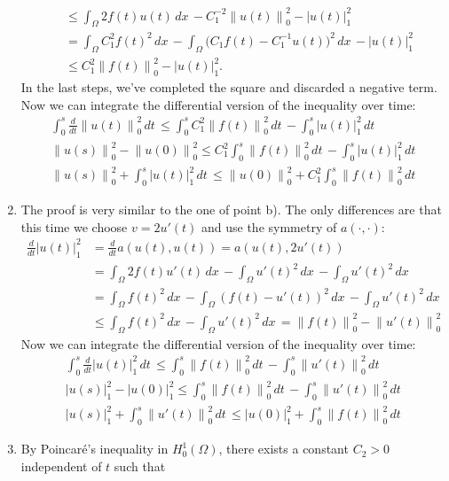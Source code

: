 \documentclass[a4paper]{article}
\newcommand{\dx}{\, dx \,}
\newcommand{\dt}{\, dt \,}
\newcommand{\seminorm}[1]{\left\lvert #1 \right\rvert}
\newcommand{\norm}[1]{\left\lVert #1 \right\rVert}
\begin{document}
\begin{enumerate}[label=\textbf{\alph*)},leftmargin=*]
\begin{align*}
&	\leq \int_\Omega 2f(t)u(t) \dx - C_1^{-2} \norm{u(t)}_0^2 - \seminorm{u(t)}_1^2 \\
&	= \int_\Omega C_1^2 f(t)^2 \dx
		- \int_\Omega \big( C_1 f(t) - C_1^{-1} u(t) \big)^2 \dx
		- \seminorm{u(t)}_1^2 \\
&	\leq C_1^2 \norm{f(t)}_0^2 - \seminorm{u(t)}_1^2.
	\end{align*}
	In the last steps, we've completed the square and discarded a negative term.
	Now we can integrate the differential version of the inequality over time:
	\begin{gather*}
	\int_0^s \frac{d}{dt} \norm{u(t)}_0^2 \dt
	\leq \int_0^s C_1^2 \norm{f(t)}_0^2 \dt - \int_0^s \seminorm{u(t)}_1^2 \dt \\
	\norm{u(s)}_0^2 - \norm{u(0)}_0^2
	\leq C_1^2 \int_0^s \norm{f(t)}_0^2 \dt - \int_0^s \seminorm{u(t)}_1^2 \dt \\
	\norm{u(s)}_0^2 + \int_0^s \seminorm{u(t)}_1^2 \dt
	\leq \norm{u(0)}_0^2 + C_1^2 \int_0^s \norm{f(t)}_0^2 \dt
	\end{gather*}
\item The proof is very similar to the one of point b).
	The only differences are that this time we choose $v = 2u'(t)$
	and use the symmetry of $a(\cdot,\cdot)$:
	\begin{align*}
	\frac{d}{dt} \seminorm{u(t)}_1^2
&	= \frac{d}{dt} a(u(t),u(t))
	= a(u(t),2u'(t)) \\
&	= \int_\Omega 2f(t)u'(t) \dx - \int_\Omega u'(t)^2 \dx - \int_\Omega u'(t)^2 \dx \\
&	= \int_\Omega f(t)^2 \dx - \int_\Omega (f(t)-u'(t))^2 \dx - \int_\Omega u'(t)^2 \dx \\
&	\leq \int_\Omega f(t)^2 \dx - \int_\Omega u'(t)^2 \dx
	= \norm{f(t)}_0^2 - \norm{u'(t)}_0^2
	\end{align*}
	Now we can integrate the differential version of the inequality over time:
	\begin{align*}
	\int_0^s \frac{d}{dt} \seminorm{u(t)}_1^2 \dt
	\leq \int_0^s \norm{f(t)}_0^2 \dt - \int_0^s \norm{u'(t)}_0^2 \dt \\
	\seminorm{u(s)}_1^2 - \seminorm{u(0)}_1^2
	\leq \int_0^s \norm{f(t)}_0^2 \dt - \int_0^s \norm{u'(t)}_0^2 \dt \\
	\seminorm{u(s)}_1^2 + \int_0^s \norm{u'(t)}_0^2 \dt
	\leq \seminorm{u(0)}_1^2 + \int_0^s \norm{f(t)}_0^2 \dt
	\end{align*}
\item By Poincaré's inequality in $H_0^1(\Omega)$,
	there exists a constant $C_2 > 0$ independent of $t$ such that

\end{enumerate}
\end{document}

